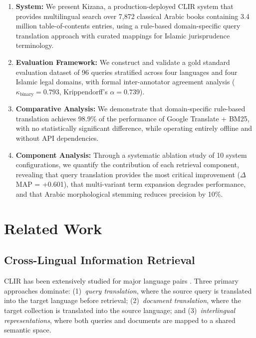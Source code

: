 \documentclass[preprint,12pt,numbers]{elsarticle}
\begin{document}
\begin{enumerate}
    \item \textbf{System:} We present Kizana, a production-deployed CLIR system that provides multilingual search over 7,872 classical Arabic books containing 3.4 million table-of-contents entries, using a rule-based domain-specific query translation approach with curated mappings for Islamic jurisprudence terminology.

    \item \textbf{Evaluation Framework:} We construct and validate a gold standard evaluation dataset of 96 queries stratified across four languages and four Islamic legal domains, with formal inter-annotator agreement analysis ($\kappa_{\text{binary}} = 0.793$, Krippendorff's $\alpha = 0.739$).

    \item \textbf{Comparative Analysis:} We demonstrate that domain-specific rule-based translation achieves 98.9\% of the performance of Google Translate + BM25, with no statistically significant difference, while operating entirely offline and without API dependencies.

    \item \textbf{Component Analysis:} Through a systematic ablation study of 10 system configurations, we quantify the contribution of each retrieval component, revealing that query translation provides the most critical improvement ($\Delta$MAP = +0.601), that multi-variant term expansion degrades performance, and that Arabic morphological stemming reduces precision by 10\%.
\end{enumerate}

\section{Related Work}
\label{sec:related}

\subsection{Cross-Lingual Information Retrieval}

CLIR has been extensively studied for major language pairs \citep{nie2010cross,zhou2012cross}. Three primary approaches dominate: (1)~\textit{query translation}, where the source query is translated into the target language before retrieval; (2)~\textit{document translation}, where the target collection is translated into the source language; and (3)~\textit{interlingual representations}, where both queries and documents are mapped to a shared semantic space.
\end{document}
